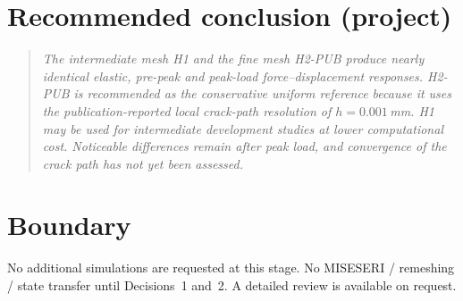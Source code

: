 \documentclass[10pt,a4paper]{article}
\begin{document}
\section*{Recommended conclusion (project)}
\begin{quote}
\itshape
The intermediate mesh H1 and the fine mesh H2-PUB produce nearly identical elastic, pre-peak and peak-load force--displacement responses.
H2-PUB is recommended as the conservative uniform reference because it uses the publication-reported local crack-path resolution of $h=0.001$\,mm.
H1 may be used for intermediate development studies at lower computational cost.
Noticeable differences remain after peak load, and convergence of the crack path has not yet been assessed.
\end{quote}

\section*{Boundary}
No additional simulations are requested at this stage.
No MISESERI / remeshing / state transfer until Decisions~1 and~2.
A detailed review is available on request.
\end{document}

